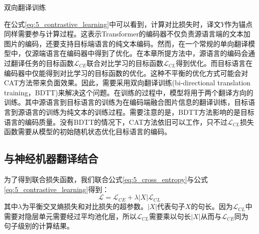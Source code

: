{\sffamily 双向翻译训练}

在公式\ref{eq:5_contrastive_learning}中可以看到，计算对比损失时，译文$Y$作为锚点同样需要参与计算过程。这表示Transformer的编码器不仅负责源语言端的文本加图片的编码，还要支持目标端语言的纯文本编码。然而，在一个常规的单向翻译模型中，仅源端语言在编码器中得到了优化。在本章所提方法中，源语言的编码会通过翻译任务的目标函数$\mathcal{L}_{CE}$联合对比学习的目标函数$\mathcal{L}_{CL}$得到优化。而目标语言在编码器中仅能得到对比学习的目标函数的优化。这种不平衡的优化方式可能会对CAT方法带来负面效果。因此，需要采用双向翻译训练(bi-directional translation training，BDTT)来解决这个问题。在训练的过程中，模型将用于两个翻译方向的训练。其中源语言到目标语言的训练为在编码端融合图片信息的翻译训练，目标语言到源语言的训练为纯文本的训练过程。需要注意的是，BDTT方法影响的是目标语言的编码质量。没有BDTT的情况下，CAT方法依旧可以工作，只不过$\mathcal{L}_{CL}$损失函数需要从模型的初始随机状态优化目标语言的编码。

\subsection{与神经机器翻译结合}
\label{sec:5_combine_with_nmt}

为了得到联合损失函数，我们联合公式\ref{eq:5_cross_entropy}与公式\ref{eq:5_contrastive_learning}得到：
\begin{equation}
    \mathcal{L}=\mathcal{L}_{CE} + \lambda|X|\mathcal{L}_{CL}
    \label{eq:5_combine_with_nmt}
\end{equation}
其中$\lambda$为平衡交叉熵损失和对比损失的超参数。$|X|$代表句子$X$的句长。因为$\mathcal{L}_{CL}$中需要对隐层单元需要经过平均池化层，所以$\mathcal{L}_{CL}$需要乘以句长$|X|$从而与$\mathcal{L}_{CE}$同为句子级别的计算结果。